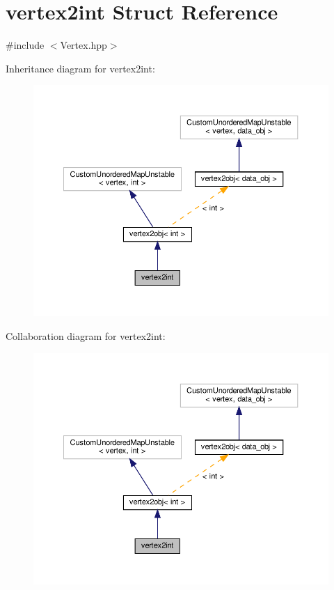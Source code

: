 \hypertarget{structvertex2int}{}\section{vertex2int Struct Reference}
\label{structvertex2int}


{\ttfamily \#include $<$Vertex.\+hpp$>$}



Inheritance diagram for vertex2int\+:
\nopagebreak
\begin{figure}[H]
\begin{center}
\leavevmode
\includegraphics[width=350pt]{d5/de9/structvertex2int__inherit__graph}
\end{center}
\end{figure}


Collaboration diagram for vertex2int\+:
\nopagebreak
\begin{figure}[H]
\begin{center}
\leavevmode
\includegraphics[width=350pt]{df/d85/structvertex2int__coll__graph}
\end{center}
\end{figure}
